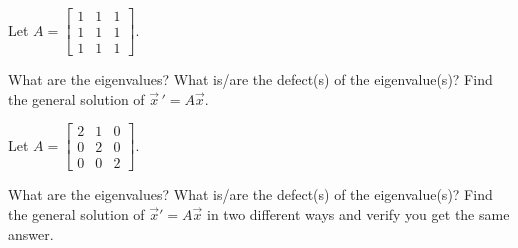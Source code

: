 \begin{exercise}\ansMark%
Let $A =
\left[ \begin{smallmatrix}
1 & 1 & 1 \\
1 & 1 & 1 \\
1 & 1 & 1 
\end{smallmatrix}\right]$.  
\begin{tasks}
\task What are the eigenvalues?
\task What is/are the defect(s) of the eigenvalue(s)?
\task Find the general solution of $\vec{x}\,' = A\vec{x}$.
\end{tasks}
\end{exercise}

\begin{exercise}
Let
$A = \left[ \begin{smallmatrix} 2 & 1 & 0 \\ 0 & 2 & 0 \\ 0 & 0 & 2 \end{smallmatrix} \right]$.
\begin{tasks}
\task What are the eigenvalues?
\task What is/are the defect(s) of the eigenvalue(s)?
\task Find the general solution of ${\vec{x}}' = A \vec{x}$ in two different
ways and verify you get the same answer.
\end{tasks}
\end{exercise}

